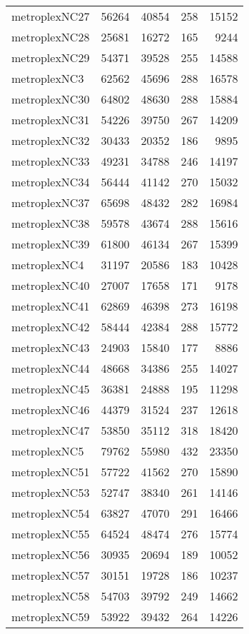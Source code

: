 \begin{tabular}{lrrrr}
metroplexNC27 & 56264 & 40854 & 258 & 15152 \\
metroplexNC28 & 25681 & 16272 & 165 & 9244 \\
metroplexNC29 & 54371 & 39528 & 255 & 14588 \\
metroplexNC3 & 62562 & 45696 & 288 & 16578 \\
metroplexNC30 & 64802 & 48630 & 288 & 15884 \\
metroplexNC31 & 54226 & 39750 & 267 & 14209 \\
metroplexNC32 & 30433 & 20352 & 186 & 9895 \\
metroplexNC33 & 49231 & 34788 & 246 & 14197 \\
metroplexNC34 & 56444 & 41142 & 270 & 15032 \\
metroplexNC37 & 65698 & 48432 & 282 & 16984 \\
metroplexNC38 & 59578 & 43674 & 288 & 15616 \\
metroplexNC39 & 61800 & 46134 & 267 & 15399 \\
metroplexNC4 & 31197 & 20586 & 183 & 10428 \\
metroplexNC40 & 27007 & 17658 & 171 & 9178 \\
metroplexNC41 & 62869 & 46398 & 273 & 16198 \\
metroplexNC42 & 58444 & 42384 & 288 & 15772 \\
metroplexNC43 & 24903 & 15840 & 177 & 8886 \\
metroplexNC44 & 48668 & 34386 & 255 & 14027 \\
metroplexNC45 & 36381 & 24888 & 195 & 11298 \\
metroplexNC46 & 44379 & 31524 & 237 & 12618 \\
metroplexNC47 & 53850 & 35112 & 318 & 18420 \\
metroplexNC5 & 79762 & 55980 & 432 & 23350 \\
metroplexNC51 & 57722 & 41562 & 270 & 15890 \\
metroplexNC53 & 52747 & 38340 & 261 & 14146 \\
metroplexNC54 & 63827 & 47070 & 291 & 16466 \\
metroplexNC55 & 64524 & 48474 & 276 & 15774 \\
metroplexNC56 & 30935 & 20694 & 189 & 10052 \\
metroplexNC57 & 30151 & 19728 & 186 & 10237 \\
metroplexNC58 & 54703 & 39792 & 249 & 14662 \\
metroplexNC59 & 53922 & 39432 & 264 & 14226 \\

\end{tabular}
